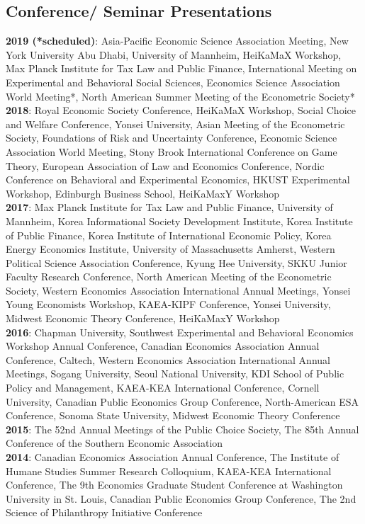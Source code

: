 \documentclass[margin, letterpaper]{res}
\begin{document}
\begin{resume}
\section{Conference/ Seminar Presentations}
\textbf{2019 (*scheduled)}: Asia-Pacific Economic Science Association Meeting, New York University Abu Dhabi, University of Mannheim, HeiKaMaX Workshop, Max Planck Institute for Tax Law and Public Finance, International Meeting on Experimental and Behavioral Social Sciences, Economics Science Association World Meeting*, North American Summer Meeting of the Econometric Society*\\
\textbf{2018}: Royal Economic Society Conference, HeiKaMaX Workshop, Social Choice and Welfare Conference, Yonsei University, Asian Meeting of the Econometric Society, Foundations of Risk and Uncertainty Conference, Economic Science Association World Meeting, Stony Brook International Conference on Game Theory, European Association of Law and Economics Conference, Nordic Conference on Behavioral and Experimental Economics, HKUST Experimental Workshop, Edinburgh Business School, HeiKaMaxY Workshop\\
\textbf{2017}: Max Planck Institute for Tax Law and Public Finance, University of Mannheim, Korea Informational Society Development Institute, Korea Institute of Public Finance, Korea Institute of International Economic Policy, Korea Energy Economics Institute, University of Massachusetts Amherst, Western Political Science Association Conference, Kyung Hee University, SKKU Junior Faculty Research Conference, North American Meeting of the Econometric Society, Western Economics Association International Annual Meetings, Yonsei Young Economists Workshop, KAEA-KIPF Conference, Yonsei University, Midwest Economic Theory Conference, HeiKaMaxY Workshop\\
\textbf{2016}: Chapman University, Southwest Experimental and Behavioral Economics Workshop Annual Conference, Canadian Economics Association Annual Conference, Caltech, Western Economics Association International Annual Meetings, Sogang University, Seoul National University, KDI School of Public Policy and Management, KAEA-KEA International Conference, Cornell University, Canadian Public Economics Group Conference, North-American ESA Conference, Sonoma State University, Midwest Economic Theory Conference\\
\textbf{2015}: The 52nd Annual Meetings of the Public Choice Society, The 85th Annual Conference of the Southern Economic Association\\
\textbf{2014}: Canadian Economics Association Annual Conference, The Institute of Humane Studies Summer Research Colloquium, KAEA-KEA International Conference, The 9th Economics Graduate Student Conference at Washington University in St. Louis, Canadian Public Economics Group Conference, The 2nd Science of Philanthropy Initiative Conference


\end{resume}
\end{document}
